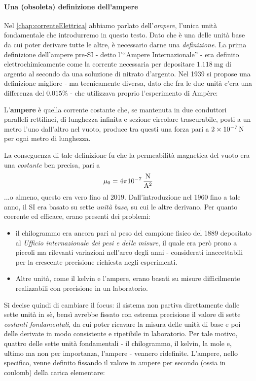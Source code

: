 \paragraph{Una (obsoleta) definizione dell'ampere} %
Nel \autoref{chap:correnteElettrica} abbiamo parlato dell'\textit{ampere}, l'unica unità fondamentale che introdurremo in questo testo. Dato che è una delle unità base da cui poter derivare tutte le altre, è necessario darne una \textit{definizione}.
La prima definizione dell'ampere pre-SI - detto l'‘‘Ampere Internazionale'' - era definito elettrochimicamente come la corrente necessaria per depositare $\SI{1.118}{\milli\gram}$ di argento al secondo da una soluzione di nitrato d'argento. Nel 1939 si propose una definizione migliore - ma tecnicamente diversa, dato che fra le due unità c'era una differenza del $0.015\%$ - che utilizzava proprio l'esperimento di Ampère:
\begin{define}[Ampere (1960)]
	L'\textbf{ampere} è quella corrente costante che, se mantenuta in due conduttori paralleli rettilinei, di lunghezza infinita e sezione circolare trascurabile, posti a un metro l'uno dall'altro nel vuoto, produce tra questi una forza pari a $\SI{2d-7}{\newton}$ per ogni metro di lunghezza.
\end{define}
La conseguenza di tale definizione fu che la permeabilità magnetica del vuoto era una \textit{costante} ben precisa, pari a
\begin{equation}
	\mu_0=4\pi \SI[per-mode = fraction]{d-7}{\newton\per\ampere\squared}
\end{equation}
...o almeno, questo era vero fino al 2019. Dall'introduzione nel 1960 fino a tale anno, il SI era basato su sette \textit{unità base}, su cui le altre derivano. Per quanto coerente ed efficace, erano presenti dei problemi:
\begin{itemize}
	\item il chilogrammo era ancora pari al peso del campione fisico del 1889 depositato al \textit{Ufficio internazionale dei pesi e delle misure}, il quale era però prono a piccoli ma rilevanti variazioni nell'arco degli anni - considerati inaccettabili per la crescente precisione richiesta negli esperimenti.
	\item Altre unità, come il kelvin e l'ampere, erano basati su misure difficilmente realizzabili con precisione in un laboratorio. 
\end{itemize}
Si decise quindi di cambiare il focus: il sistema non partiva direttamente dalle sette unità in sè, bensì avrebbe fissato con estrema precisione il valore di sette \textit{costanti fondamentali}, da cui poter ricavare la misura delle unità di base e poi delle derivate in modo consistente e ripetibile in laboratorio. Per tale motivo, quattro delle sette unità fondamentali - il chilogrammo, il kelvin, la mole e, ultimo ma non per importanza, l'ampere - vennero ridefinite. L'ampere, nello specifico, venne definito fissando il valore in ampere per secondo (ossia in coulomb) della carica elementare:
